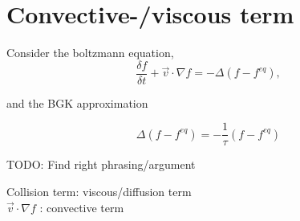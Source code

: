 


\section{Convective-/viscous term}


Consider the boltzmann equation, 
\begin{equation}
    \frac{\delta f}{\delta t} + \vec{v}\cdot\nabla{f} = -\Delta(f-f^{eq}),
\end{equation}

and the BGK approximation

\begin{equation}
    \Delta (f - f^{eq}) = -\frac{1}{\tau}(f - f^{eq})
\end{equation}


TODO: Find right phrasing/argument

Collision term: viscous/diffusion term\\
$\vec{v}\cdot\nabla{f}$ : convective term
